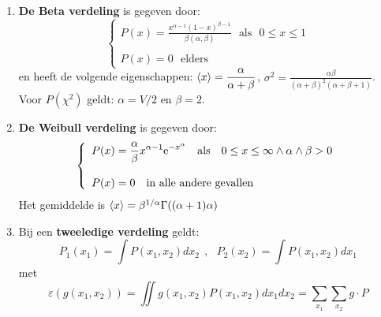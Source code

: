 \documentclass[twoside]{report}
\begin{document}
\begin{enumerate}
\[\begin{array}{l}
      P(x)=\frac{x^{\alpha-1}{\rm e}^{-x/\beta}}{\beta^\alpha\Gamma(\alpha)}~~~\mbox{als}~~~0\leq y\leq\infty
      \end{array}\right.
      \]
      met $\alpha>0$ en $\beta>0$. De verdeling heeft
      de volgende eigenschappen: $\av{x}=\alpha\beta$, $\sigma^2=\alpha\beta^2$.
\item {\bf De Beta verdeling} is gegeven door:
      \[
      \left\{\begin{array}{l}\displaystyle
      P(x)=\frac{x^{\alpha-1}(1-x)^{\beta-1}}{\beta(\alpha,\beta)}~~~\mbox{als}~~~0\leq x\leq1\\
      \\
      P(x)=0~~~\mbox{elders}
      \end{array}\right.
      \]
      en heeft de volgende eigenschappen: $\displaystyle\left\langle x \right\rangle=\frac{\alpha}{\alpha+\beta}$,
      $\displaystyle\sigma^2=\frac{\alpha\beta}{(\alpha+\beta)^2(\alpha+\beta+1)}$.
      \npar
      Voor $P(\chi^2)$ geldt: $\alpha=V/2$ en $\beta=2$.
\item {\bf De Weibull verdeling} is gegeven door:
      \[
      \left\{\begin{array}{l}\displaystyle
      P(x)=\frac{\alpha}{\beta}x^{\alpha-1}{\rm e}^{-x^\alpha}~~~\mbox{als}~~~0\leq x\leq\infty\wedge\alpha\wedge\beta>0\\
      \\
      P(x)=0~~~\mbox{in alle andere gevallen}
      \end{array}\right.
      \]
      Het gemiddelde is $\left\langle x \right\rangle=\beta^{1/\alpha}\Gamma((\alpha+1)\alpha)$
\item Bij een {\bf tweeledige verdeling} geldt:
      \[
      P_1(x_1)=\int P(x_1,x_2)dx_2~~,~~~P_2(x_2)=\int P(x_1,x_2)dx_1
      \]
      met
      \[
      \varepsilon(g(x_1,x_2))=\iint g(x_1,x_2)P(x_1,x_2)dx_1dx_2=\sum_{x_1}\sum_{x_2}g\cdot P
      \]
\end{enumerate}
\end{document}
